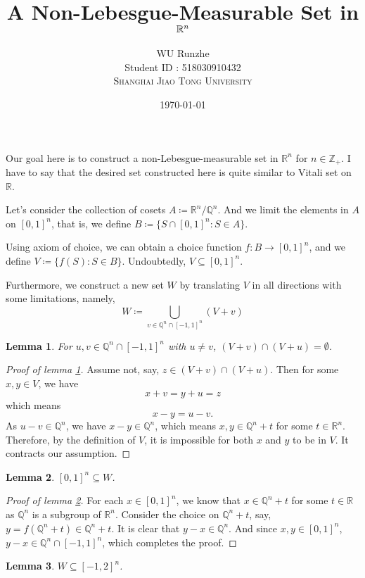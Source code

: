 \documentclass[12pt]{article}
\title{A Non-Lebesgue-Measurable Set in $\bR^n$}
\author{WU Runzhe\\
	Student ID : 518030910432\\
	\textsc{Shanghai Jiao Tong University}}
\date{\today}
\newcommand\bZ{\mathbb{Z}}
\newcommand\bQ{\mathbb{Q}}
\newcommand\bR{\mathbb{R}}
\newcommand\ce{\coloneqq}
\newtheorem{lemma}{Lemma}
\begin{document}
	\maketitle
	
	Our goal here is to construct a non-Lebesgue-measurable set in $\bR^n$ for $n\in \bZ_+$. I have to say that the desired set constructed here is quite similar to Vitali set on $\bR$.
	
	Let's consider the collection of cosets $A\ce\bR^n/\bQ^n$. And we limit the elements in $A$ on $[0,1]^n$, that is, we define $B\ce \{S\cap[0,1]^n:S\in A \} $.
	
	Using axiom of choice, we can obtain a choice function $ f : B \rightarrow [0,1]^n $, and we define $V\ce \{f(S):S \in B\}$. Undoubtedly, $V \subseteq [0,1]^n$.
	
	Furthermore, we construct a new set $W$ by translating $V$ in all directions with some limitations, namely, 
	\begin{equation}\label{w}
		W\ce \bigcup_{v\in  \bQ^n\cap[-1,1]^n} (V+v)
	\end{equation}
	
	\begin{lemma}\label{l0}
		For $u,v\in  \bQ^n\cap[-1,1]^n$ with $u\not=v$, $(V+v)\cap (V+u)=\emptyset$.
	\end{lemma}

	\begin{proof}[Proof of lemma \ref{l0}]
		Assume not, say, $z\in (V+v)\cap (V+u)$. Then  for some $x,y\in V$, we have
		$$x+v=y+u=z$$
		which means
		$$x-y=u-v.$$
		As $u-v\in \bQ^n$, we have $x-y\in \bQ^n$, which means $x,y\in \bQ^n+t$ for some $t\in \bR^n$. Therefore, by the definition of $V$, it is impossible for both $x$ and $y$ to be in $V$. It contracts our assumption.
	\end{proof}
	
	\begin{lemma}\label{l1}
		$[0,1]^n\subseteq W$.
	\end{lemma}

	\begin{proof}[Proof of lemma \ref{l1}]
		For each $x\in [0,1]^n$, we know that $x\in \bQ^n+t$ for some $t\in \bR$ as $\bQ^n$ is a subgroup of $\bR^n$. Consider the choice on $\bQ^n+t$, say, $y=f(\bQ^n+t)\in\bQ^n+t$. It is clear that $y-x\in \bQ^n$. And since $x,y\in[0,1]^n$, $y-x\in \bQ^n\cap[-1,1]^n$, which completes the proof.
	\end{proof}
	
	\begin{lemma}\label{l2}
		$W\subseteq [-1,2]^n$.
	\end{lemma}
\end{document}

